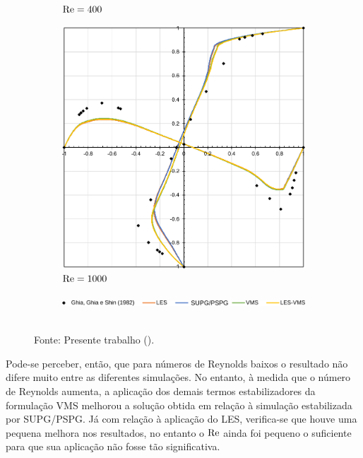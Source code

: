 \begin{figure}[h!]
\begin{subfigure}{0.49\textwidth}
        \caption{$\mathrm{Re}=400$}
    \end{subfigure}
    \begin{subfigure}{0.49\textwidth}
        \centering
        \includegraphics[width=\linewidth]{Figuras/cavity3D/Re1000.pdf}
        \caption{$\mathrm{Re}=1000$}
    \end{subfigure}
    \begin{subfigure}{\textwidth}
        \centering
        \includegraphics[width=0.5\linewidth]{Figuras/cavity3D/legenda.pdf}
    \end{subfigure}
    \\Fonte: Presente trabalho (\the\year).
    \label{fig:cavity-results4}
\end{figure}

Pode-se perceber, então, que para números de Reynolds baixos o resultado não difere muito entre as diferentes simulações. No entanto, à medida que o número de Reynolds aumenta, a aplicação dos demais termos estabilizadores da formulação VMS melhorou a solução obtida em relação à simulação estabilizada por SUPG/PSPG. Já com relação à aplicação do LES, verifica-se que houve uma pequena melhora nos resultados, no entanto o $\mathrm{Re}$ ainda foi pequeno o suficiente para que sua aplicação não fosse tão significativa.

